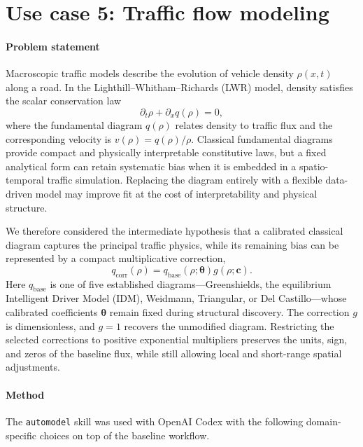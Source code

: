 \section{Use case 5: Traffic flow modeling}
\label{sec:traffic-flow}

\paragraph{Problem statement}
Macroscopic traffic models describe the evolution of vehicle density
$\rho(x,t)$ along a road. In the Lighthill--Whitham--Richards (LWR) model,
density satisfies the scalar conservation law
\begin{equation}
    \partial_t \rho + \partial_x q(\rho) = 0,
    \label{eq:traffic-lwr}
\end{equation}
where the fundamental diagram $q(\rho)$ relates density to traffic flux and
the corresponding velocity is $v(\rho)=q(\rho)/\rho$. Classical fundamental
diagrams provide compact and physically interpretable constitutive laws, but a
fixed analytical form can retain systematic bias when it is embedded in a
spatio-temporal traffic simulation. Replacing the diagram entirely with a
flexible data-driven model may improve fit at the cost of interpretability and
physical structure.

We therefore considered the intermediate hypothesis that a calibrated
classical diagram captures the principal traffic physics, while its remaining
bias can be represented by a compact multiplicative correction,
\begin{equation}
    q_{\mathrm{corr}}(\rho)
    = q_{\mathrm{base}}(\rho;\boldsymbol{\theta})
      g(\rho;\boldsymbol{c}).
    \label{eq:traffic-correction}
\end{equation}
Here $q_{\mathrm{base}}$ is one of five established diagrams---Greenshields,
the equilibrium Intelligent Driver Model (IDM), Weidmann, Triangular, or Del
Castillo---whose calibrated coefficients $\boldsymbol{\theta}$ remain fixed
during structural discovery. The correction $g$ is dimensionless, and
$g=1$ recovers the unmodified diagram. Restricting the selected corrections to
positive exponential multipliers preserves the units, sign, and zeros of the
baseline flux, while still allowing local and short-range spatial adjustments.

\paragraph{Method}
The \texttt{automodel} skill was used with OpenAI Codex with the following
domain-specific choices on top of the baseline workflow.

